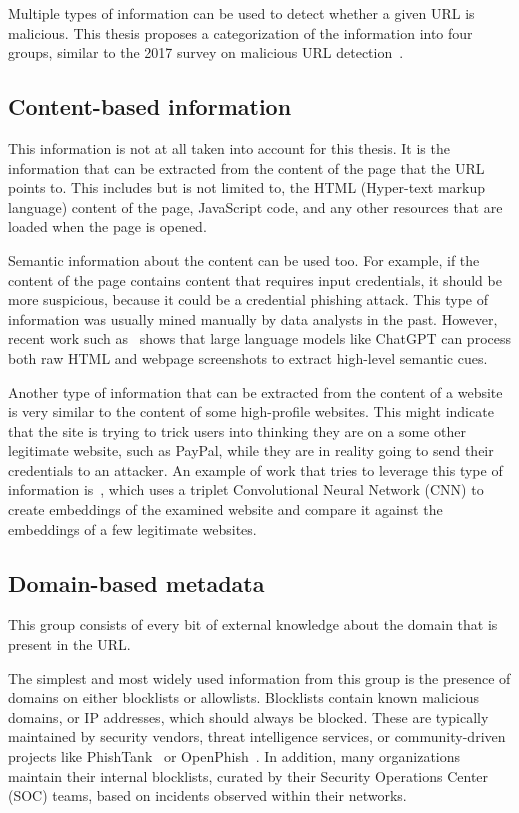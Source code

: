 Multiple types of information can be used to detect whether a given URL is malicious. This thesis proposes a categorization of the information into four groups, similar to the 2017 survey on malicious URL detection~\cite{surveymaliciousfeatures}.

\subsection{Content-based information}
\label{sec:content_based_info}
This information is not at all taken into account for this thesis. It is the information that can be extracted from the content of the page that the URL points to. This includes but is not limited to, the HTML (Hyper-text markup language) content of the page, JavaScript code, and any other resources that are loaded when the page is opened.

Semantic information about the content can be used too. For example, if the content of the page contains content that requires input credentials, it should be more suspicious, because it could be a credential phishing attack. This type of information was usually mined manually by data analysts in the past. However, recent work such as~\cite{koide2025detectingphishingsitesusing} shows that large language models like ChatGPT can process both raw HTML and webpage screenshots to extract high-level semantic cues.

Another type of information that can be extracted from the content of a website is very similar to the content of some high-profile websites. This might indicate that the site is trying to trick users into thinking they are on a some other legitimate website, such as PayPal, while they are in reality going to send their credentials to an attacker. An example of work that tries to leverage this type of information is~\cite{VisualPhishNet}, which uses a triplet Convolutional Neural Network (CNN) to create embeddings of the examined website and compare it against the embeddings of a few legitimate websites.

\subsection{Domain-based metadata}
\label{sec:domain_based_info}
This group consists of every bit of external knowledge about the domain that is present in the URL.

The simplest and most widely used information from this group is the presence of domains on either blocklists or allowlists. Blocklists contain known malicious domains, or IP addresses, which should always be blocked. These are typically maintained by security vendors, threat intelligence services, or community-driven projects like PhishTank~\cite{PhishTank} or OpenPhish~\cite{OpenPhish}. In addition, many organizations maintain their internal blocklists, curated by their Security Operations Center (SOC) teams, based on incidents observed within their networks.

